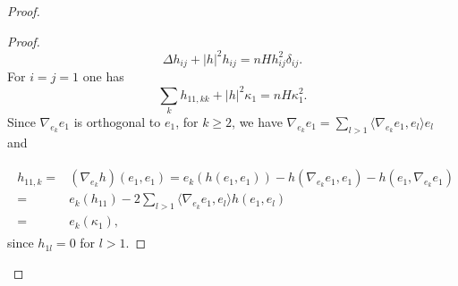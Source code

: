 \documentclass[11pt]{amsart}
\theoremstyle{plain}
\numberwithin{equation}{section}
\numberwithin{theorem}{section}
\begin{document}
\begin{proof}
\begin{proof}
\begin{equation}
	\label{SimonEq2}
	\Delta h_{ij}+|h|^2h_{ij}=nHh_{ij}^2\delta_{ij}.
\end{equation}	
For $i=j=1$ one has 
	\begin{equation}
		\label{SimonEq3}
		\sum_{k}h_{11,kk}+|h|^2\kappa_1=nH\kappa_{1}^2.
	\end{equation}		
Since $\nabla_{e_k}e_1$ is orthogonal to $e_1$, for  $k\geq 2$, we have $\nabla_{e_k}e_1=\sum_{l>1}\langle \nabla_{e_k}e_1, e_l\rangle e_l$ and 



 \begin{align}
	\begin{split}
	\label{conta-I}
	h_{11,k}  =& \left(\nabla_{e_k} h\right)(e_1, e_1)  = e_k(h(e_1,e_1))-h\left(\nabla_{e_{k}}e_1 , e_1\right)-h\left(e_1 , \nabla_{e_{k}} e_1\right)  \\ =& e_k(h_{11})-2\sum_{l>1}\langle \nabla_{e_k}e_1, e_l\rangle h\left(e_1 , e_l\right)\\ =& e_k(\kappa_{1}),
		\end{split}
\end{align}
since $h_{1l}=0$ for $l>1.$ 


\end{proof}
\end{proof}
\end{document}
